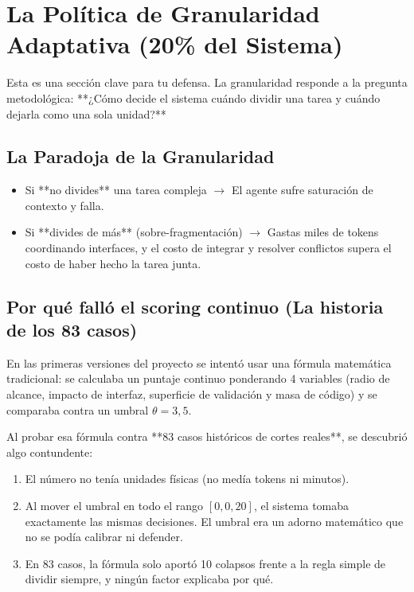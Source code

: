 \documentclass[11pt,a4paper]{article}
\begin{document}
\section{La Política de Granularidad Adaptativa (20\% del Sistema)}

Esta es una sección clave para tu defensa. La granularidad responde a la pregunta metodológica: **¿Cómo decide el sistema cuándo dividir una tarea y cuándo dejarla como una sola unidad?**

\subsection{La Paradoja de la Granularidad}
\begin{itemize}
  \item Si **no divides** una tarea compleja $\rightarrow$ El agente sufre saturación de contexto y falla.
  \item Si **divides de más** (sobre-fragmentación) $\rightarrow$ Gastas miles de tokens coordinando interfaces, y el costo de integrar y resolver conflictos supera el costo de haber hecho la tarea junta.
\end{itemize}

\subsection{Por qué falló el scoring continuo (La historia de los 83 casos)}
En las primeras versiones del proyecto se intentó usar una fórmula matemática tradicional: se calculaba un puntaje continuo ponderando 4 variables (radio de alcance, impacto de interfaz, superficie de validación y masa de código) y se comparaba contra un umbral $\theta = 3{,}5$.

Al probar esa fórmula contra **83 casos históricos de cortes reales**, se descubrió algo contundente:
\begin{enumerate}
  \item El número no tenía unidades físicas (no medía tokens ni minutos).
  \item Al mover el umbral en todo el rango $[0, 0{,}20]$, el sistema tomaba exactamente las mismas decisiones. El umbral era un adorno matemático que no se podía calibrar ni defender.
  \item En 83 casos, la fórmula solo aportó 10 colapsos frente a la regla simple de dividir siempre, y ningún factor explicaba por qué.
\end{enumerate}
\end{document}

